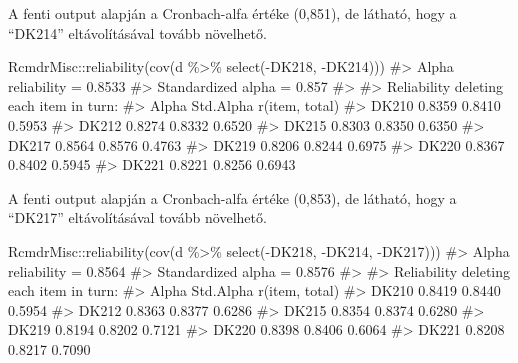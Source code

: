 \documentclass[
  letterpaper,
]{krantz}
\makeatletter
\newenvironment{Shaded}{\begin{snugshade}}{\end{snugshade}}
\newcommand{\CommentTok}[1]{\textcolor[rgb]{0.37,0.37,0.37}{#1}}
\newcommand{\FunctionTok}[1]{\textcolor[rgb]{0.28,0.35,0.67}{#1}}
\newcommand{\NormalTok}[1]{\textcolor[rgb]{0.00,0.23,0.31}{#1}}
\newcommand{\SpecialCharTok}[1]{\textcolor[rgb]{0.37,0.37,0.37}{#1}}
\newenvironment{kframe}{%
\medskip{}
\setlength{\fboxsep}{.8em}
 \def\at@end@of@kframe{}%
 \ifinner\ifhmode%
  \def\at@end@of@kframe{\end{minipage}}%
  \begin{minipage}{\columnwidth}%
 \fi\fi%
 \def\FrameCommand##1{\hskip\@totalleftmargin \hskip-\fboxsep
 \colorbox{shadecolor}{##1}\hskip-\fboxsep
     \hskip-\linewidth \hskip-\@totalleftmargin \hskip\columnwidth}%
 \MakeFramed {\advance\hsize-\width
   \@totalleftmargin\z@ \linewidth\hsize
   \@setminipage}}%
 {\par\unskip\endMakeFramed%
 \at@end@of@kframe}
\renewenvironment{Shaded}{\begin{kframe}}{\end{kframe}}
\makeatother
\begin{document}
A fenti output alapján a Cronbach-alfa értéke (0,851), de látható, hogy
a ``DK214'' eltávolításával tovább növelhető.

\begin{Shaded}
\begin{Highlighting}[]
\NormalTok{RcmdrMisc}\SpecialCharTok{::}\FunctionTok{reliability}\NormalTok{(}\FunctionTok{cov}\NormalTok{(d }\SpecialCharTok{\%\textgreater{}\%}
    \FunctionTok{select}\NormalTok{(}\SpecialCharTok{{-}}\NormalTok{DK218, }\SpecialCharTok{{-}}\NormalTok{DK214)))}
\CommentTok{\#\textgreater{} Alpha reliability =  0.8533 }
\CommentTok{\#\textgreater{} Standardized alpha =  0.857 }
\CommentTok{\#\textgreater{} }
\CommentTok{\#\textgreater{} Reliability deleting each item in turn:}
\CommentTok{\#\textgreater{}        Alpha Std.Alpha r(item, total)}
\CommentTok{\#\textgreater{} DK210 0.8359    0.8410         0.5953}
\CommentTok{\#\textgreater{} DK212 0.8274    0.8332         0.6520}
\CommentTok{\#\textgreater{} DK215 0.8303    0.8350         0.6350}
\CommentTok{\#\textgreater{} DK217 0.8564    0.8576         0.4763}
\CommentTok{\#\textgreater{} DK219 0.8206    0.8244         0.6975}
\CommentTok{\#\textgreater{} DK220 0.8367    0.8402         0.5945}
\CommentTok{\#\textgreater{} DK221 0.8221    0.8256         0.6943}
\end{Highlighting}
\end{Shaded}

A fenti output alapján a Cronbach-alfa értéke (0,853), de látható, hogy
a ``DK217'' eltávolításával tovább növelhető.

\begin{Shaded}
\begin{Highlighting}[]
\NormalTok{RcmdrMisc}\SpecialCharTok{::}\FunctionTok{reliability}\NormalTok{(}\FunctionTok{cov}\NormalTok{(d }\SpecialCharTok{\%\textgreater{}\%}
    \FunctionTok{select}\NormalTok{(}\SpecialCharTok{{-}}\NormalTok{DK218, }\SpecialCharTok{{-}}\NormalTok{DK214, }\SpecialCharTok{{-}}\NormalTok{DK217)))}
\CommentTok{\#\textgreater{} Alpha reliability =  0.8564 }
\CommentTok{\#\textgreater{} Standardized alpha =  0.8576 }
\CommentTok{\#\textgreater{} }
\CommentTok{\#\textgreater{} Reliability deleting each item in turn:}
\CommentTok{\#\textgreater{}        Alpha Std.Alpha r(item, total)}
\CommentTok{\#\textgreater{} DK210 0.8419    0.8440         0.5954}
\CommentTok{\#\textgreater{} DK212 0.8363    0.8377         0.6286}
\CommentTok{\#\textgreater{} DK215 0.8354    0.8374         0.6280}
\CommentTok{\#\textgreater{} DK219 0.8194    0.8202         0.7121}
\CommentTok{\#\textgreater{} DK220 0.8398    0.8406         0.6064}
\CommentTok{\#\textgreater{} DK221 0.8208    0.8217         0.7090}
\end{Highlighting}
\end{Shaded}
\end{document}
